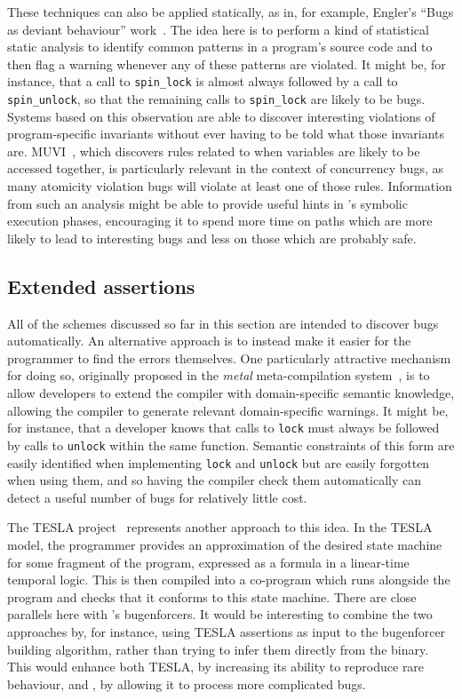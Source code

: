 These techniques can also be applied statically, as in, for example,
Engler's ``Bugs as deviant behaviour'' work~\cite{Engler2001}.  The
idea here is to perform a kind of statistical static analysis to
identify common patterns in a program's source code and to then flag a
warning whenever any of these patterns are violated.  It might be, for
instance, that a call to \texttt{spin\_lock} is almost always followed
by a call to \texttt{spin\_unlock}, so that the remaining calls to
\texttt{spin\_lock} are likely to be bugs.  Systems based on this
observation are able to discover interesting violations of
program-specific invariants without ever having to be told what those
invariants are.  MUVI~\cite{Lu2007}, which discovers rules related to
when variables are likely to be accessed together, is particularly
relevant in the context of concurrency bugs, as many atomicity
violation bugs will violate at least one of those rules.  Information
from such an analysis might be able to provide useful hints in
{\technique}'s symbolic execution phases, encouraging it to spend more
time on paths which are more likely to lead to interesting bugs and
less on those which are probably safe.

\subsection{Extended assertions}

All of the schemes discussed so far in this section are intended to
discover bugs automatically.  An alternative approach is to instead
make it easier for the programmer to find the errors themselves.  One
particularly attractive mechanism for doing so, originally proposed in
the \textit{metal} meta-compilation system~\cite{Engler2000a}, is to
allow developers to extend the compiler with domain-specific semantic
knowledge, allowing the compiler to generate relevant domain-specific
warnings.  It might be, for instance, that a developer knows that
calls to \texttt{lock} must always be followed by calls to
\texttt{unlock} within the same function.  Semantic constraints of
this form are easily identified when implementing \texttt{lock} and
\texttt{unlock} but are easily forgotten when using them, and so
having the compiler check them automatically can detect a useful
number of bugs for relatively little cost.

The TESLA project~\cite{FFFLocielski2011,FFFWatson2013} represents
another approach to this idea.  In the TESLA model, the programmer
provides an approximation of the desired state machine for some
fragment of the program, expressed as a formula in a linear-time
temporal logic.  This is then compiled into a co-program which runs
alongside the program and checks that it conforms to this state
machine.  There are close parallels here with {\technique}'s
\glspl{bugenforcer}.  It would be interesting to combine the two
approaches by, for instance, using TESLA assertions as input to the
\gls{bugenforcer} building algorithm, rather than trying to infer them
directly from the binary.  This would enhance both TESLA, by
increasing its ability to reproduce rare behaviour, and {\technique},
by allowing it to process more complicated bugs.

